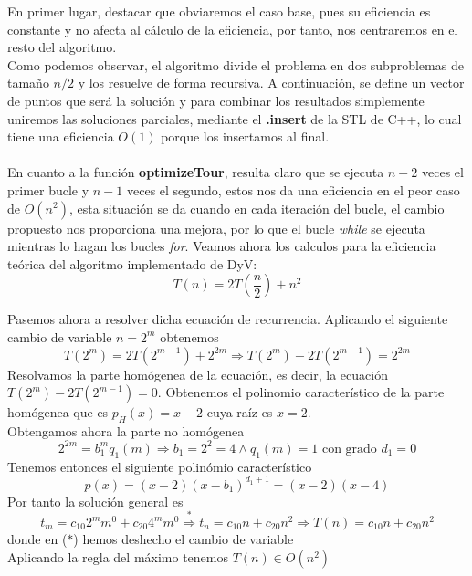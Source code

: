 \documentclass[11pt,openany]{book}
\begin{document}
En primer lugar, destacar que obviaremos el caso base, pues su eficiencia es constante y no afecta al cálculo de la eficiencia, por tanto, nos centraremos en el 
resto del algoritmo. \\
Como podemos observar, el algoritmo divide el problema en dos subproblemas de tamaño $n/2$ y los resuelve de forma recursiva. A continuación, se define un vector
de puntos que será la solución y para combinar los resultados simplemente uniremos las soluciones parciales, mediante el \textbf{.insert} de la STL de C++, lo cual
tiene una eficiencia $O(1)$ porque los insertamos al final.  \\ \\ 
En cuanto a la función \textbf{optimizeTour}, resulta claro que se ejecuta
$n-2$ veces el primer bucle y $n-1$ veces el segundo, estos nos da una eficiencia en el peor caso de 
$O(n^2)$, esta situación se da cuando en cada iteración del bucle, el cambio propuesto nos proporciona
una mejora, por lo que el bucle \textit{while} se ejecuta mientras lo hagan los bucles \textit{for}. Veamos ahora los calculos para la eficiencia teórica del algoritmo
implementado de DyV: 
\begin{equation*}
      T(n)=2T\left(\frac{n}{2}\right)+n^2
\end{equation*}

Pasemos ahora a resolver dicha ecuación de recurrencia. Aplicando el siguiente cambio de variable $n=2^m$ obtenemos
\begin{equation*}
      T(2^m)=2T(2^{m-1})+2^{2m} \Rightarrow T(2^m)-2T(2^{m-1})=2^{2m}
\end{equation*}
  Resolvamos la parte homógenea de la ecuación, es decir, la ecuación $T(2^m)-2T(2^{m-1})=0$. Obtenemos el polinomio
  característico de la parte homógenea que es $p_H(x)=x-2$ cuya raíz es $x=2$. \\
  Obtengamos ahora la parte no homógenea
\begin{equation*}
      2^{2m}=b_1^m q_1(m) \Rightarrow b_1=2^2=4 \wedge q_1(m)=1 \text{ con grado } d_1=0
\end{equation*}
  Tenemos entonces el siguiente polinómio característico
\begin{equation*}
      p(x)=(x-2)(x-b_1)^{d_1+1}=(x-2)(x-4)
\end{equation*}
  Por tanto la solución general es
\begin{equation*}
      t_m=c_{10}2^mm^0+c_{20}4^mm^0\overset{*}{\Rightarrow}  t_n=c_{10}n+c_{20}n^2 \Rightarrow T(n)=c_{10}n+c_{20}n^2
\end{equation*}
  donde en ($*$) hemos deshecho el cambio de variable \\
  Aplicando la regla del máximo tenemos $T(n) \in O(n^2)$
\end{document}
